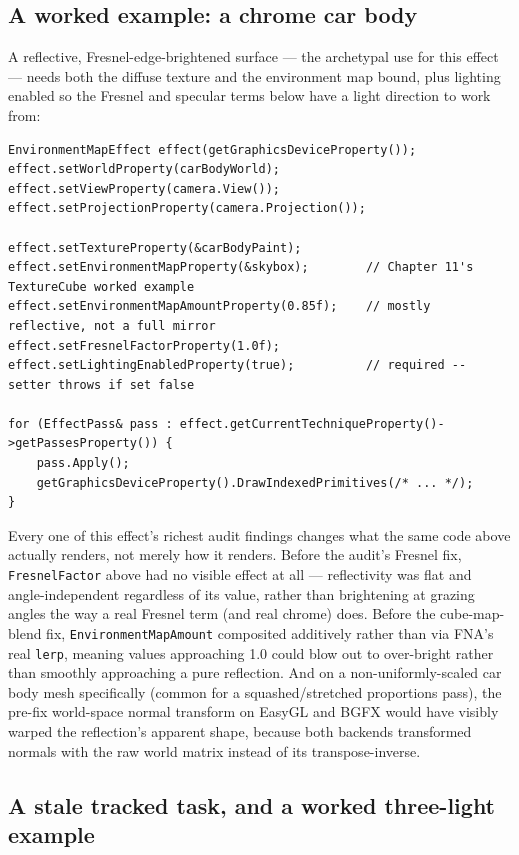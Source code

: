 \subsection{A worked example: a chrome car body}

A reflective, Fresnel-edge-brightened surface --- the archetypal use for this effect --- needs
both the diffuse texture and the  environment map bound, plus lighting
enabled so the Fresnel and specular terms below have a light direction to work from:

\begin{lstlisting}
EnvironmentMapEffect effect(getGraphicsDeviceProperty());
effect.setWorldProperty(carBodyWorld);
effect.setViewProperty(camera.View());
effect.setProjectionProperty(camera.Projection());

effect.setTextureProperty(&carBodyPaint);
effect.setEnvironmentMapProperty(&skybox);        // Chapter 11's TextureCube worked example
effect.setEnvironmentMapAmountProperty(0.85f);    // mostly reflective, not a full mirror
effect.setFresnelFactorProperty(1.0f);
effect.setLightingEnabledProperty(true);          // required -- setter throws if set false

for (EffectPass& pass : effect.getCurrentTechniqueProperty()->getPassesProperty()) {
    pass.Apply();
    getGraphicsDeviceProperty().DrawIndexedPrimitives(/* ... */);
}
\end{lstlisting}

Every one of this effect's richest audit findings changes what the same code above actually
renders, not merely how it renders. Before the audit's Fresnel fix, \texttt{FresnelFactor} above
had no visible effect at all --- reflectivity was flat and angle-independent regardless of its
value, rather than brightening at grazing angles the way a real Fresnel term (and real chrome)
does. Before the cube-map-blend fix, \texttt{EnvironmentMapAmount} composited additively rather
than via FNA's real \texttt{lerp}, meaning values approaching 1.0 could blow out to
over-bright rather than smoothly approaching a pure reflection. And on a non-uniformly-scaled
car body mesh specifically (common for a squashed/stretched proportions pass), the pre-fix
world-space normal transform on EasyGL and BGFX would have visibly warped the reflection's
apparent shape, because both backends transformed normals with the raw world matrix instead of
its transpose-inverse.

\subsection{A stale tracked task, and a worked three-light example}

